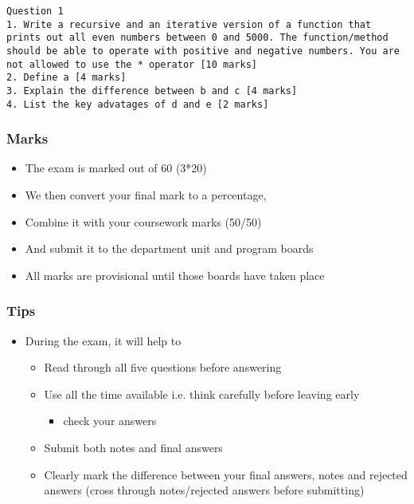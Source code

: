 \documentclass{beamer}
\begin{document}
\begin{frame}[fragile]
\begin{block}{}
\begin{lstlisting}
Question 1
1. Write a recursive and an iterative version of a function that prints out all even numbers between 0 and 5000. The function/method should be able to operate with positive and negative numbers. You are not allowed to use the * operator [10 marks]
2. Define a [4 marks]
3. Explain the difference between b and c [4 marks]
4. List the key advatages of d and e [2 marks]
\end{lstlisting}
\end{block}
\end{frame}

\begin{frame}
\frametitle{Marks}
\begin{itemize}
\item The exam is marked out of 60 (3*20)
\item We then convert your final mark to a percentage,
\item Combine it with your coursework marks (50/50)
\item And submit it to the department unit and program boards
\item All marks are provisional until those boards have taken place
\end{itemize}
\end{frame}

\begin{frame}
\frametitle{Tips}
\begin{itemize}
\item During the exam, it will help to
\begin{itemize}
\item Read through all five questions before answering
\item Use all the time available i.e.  think carefully before leaving early
\begin{itemize}
\item check your answers
\end{itemize}
\item Submit both notes and final answers 
\item Clearly mark the difference between your final answers, notes and rejected answers (cross through notes/rejected answers before submitting)
\end{itemize}
\end{itemize}
\end{frame}
\end{document}
